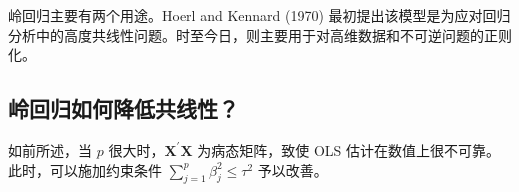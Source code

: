 %

岭回归主要有两个用途。Hoerl and Kennard (1970) 最初提出该模型是为应对回归分析中的高度共线性问题。时至今日，则主要用于对高维数据和不可逆问题的正则化。

\subsection{岭回归如何降低共线性？}
如前所述，当 $p$ 很大时，$\boldsymbol{X}^{\prime} \boldsymbol{X}$ 为病态矩阵，致使 OLS 估计在数值上很不可靠。此时，可以施加约束条件 $\sum_{j=1}^{p} \beta_{j}^{2} \leq \tau^{2}$ 予以改善。

